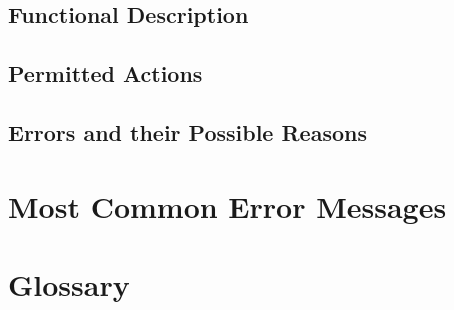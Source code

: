 \section{Functional Description}

\section{Permitted Actions}

\section{Errors and their Possible Reasons}

\appendix %
\chapter{Most Common Error Messages}
\thispagestyle{fancy}

\chapter{Glossary}
\thispagestyle{fancy}

